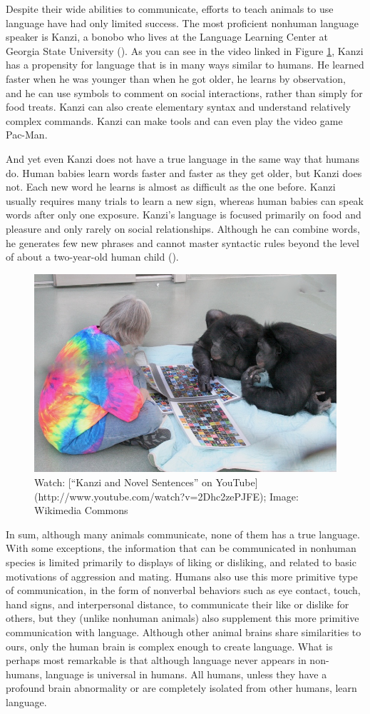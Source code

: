 \documentclass[
]{krantz}
\begin{document}
Despite their wide abilities to communicate, efforts to teach animals to use language have had only limited success. The most proficient nonhuman language speaker is Kanzi, a bonobo who lives at the Language Learning Center at Georgia State University (). As you can see in the video linked in Figure \ref{fig:kanzi}, Kanzi has a propensity for language that is in many ways similar to humans. He learned faster when he was younger than when he got older, he learns by observation, and he can use symbols to comment on social interactions, rather than simply for food treats. Kanzi can also create elementary syntax and understand relatively complex commands. Kanzi can make tools and can even play the video game Pac-Man.

And yet even Kanzi does not have a true language in the same way that humans do. Human babies learn words faster and faster as they get older, but Kanzi does not. Each new word he learns is almost as difficult as the one before. Kanzi usually requires many trials to learn a new sign, whereas human babies can speak words after only one exposure. Kanzi's language is focused primarily on food and pleasure and only rarely on social relationships. Although he can combine words, he generates few new phrases and cannot master syntactic rules beyond the level of about a two-year-old human child ().

\begin{figure}

{\centering \includegraphics[width=0.25\linewidth]{images/ch8/kanzi} 

}

\caption{Watch: [“Kanzi and Novel Sentences” on YouTube](http://www.youtube.com/watch?v=2Dhc2zePJFE); Image: Wikimedia Commons}\label{fig:kanzi}
\end{figure}

In sum, although many animals communicate, none of them has a true language. With some exceptions, the information that can be communicated in nonhuman species is limited primarily to displays of liking or disliking, and related to basic motivations of aggression and mating. Humans also use this more primitive type of communication, in the form of nonverbal behaviors such as eye contact, touch, hand signs, and interpersonal distance, to communicate their like or dislike for others, but they (unlike nonhuman animals) also supplement this more primitive communication with language. Although other animal brains share similarities to ours, only the human brain is complex enough to create language. What is perhaps most remarkable is that although language never appears in non-humans, language is universal in humans. All humans, unless they have a profound brain abnormality or are completely isolated from other humans, learn language.
\end{document}
